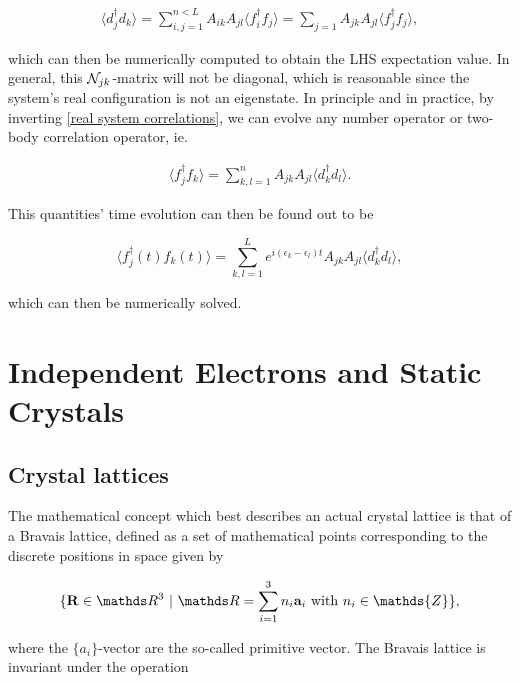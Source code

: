 \documentclass{homework}
\begin{document}
\begin{align*}
    \langle d_j^\dagger d_k \rangle = \sum_{i,j = 1}^{n < L} A_{ik} A_{jl} \langle f_i^\dagger f_j \rangle = \sum_{j=1} A_{jk} A_{jl} \langle f_j^\dagger f_j \rangle,
    \label{real system correlations}
\end{align*}

which can then be numerically computed to obtain the LHS expectation value. In general, this $\mathcal{N}_{jk}$-matrix will not be diagonal, which is reasonable since the system's real configuration is not an eigenstate. In principle and in practice, by inverting \eqref{real system correlations}, we can evolve any number operator or two-body correlation operator, ie.

\begin{align}
    \langle f_j^\dagger f_k \rangle = \sum_{k,l =1}^{n} A_{jk} A_{jl} \langle d_k^\dagger d_l \rangle.
\end{align}

This quantities' time evolution can then be found out to be 

\begin{equation}
    \langle f_j^\dagger(t) f_k(t) \rangle = \sum_{k,l =1}^{L} e^{i(\epsilon_k - \epsilon_l)t}A_{jk} A_{jl} \langle d_k^\dagger d_l \rangle,
\end{equation}

which can then be numerically solved. 

\clearpage 

\section{Independent Electrons and Static Crystals}

\subsection{Crystal lattices} 

The mathematical concept which best describes an actual crystal lattice is that of a Bravais lattice, defined as a set of mathematical points corresponding to the discrete positions in space given by 

\begin{equation}
    \{\Rb \in \R^{3} \blanky | \blanky \R = \sum_{i=1}^{3} n_i {\bf a}_i \textnormal{ with } n_i \in \mathds{Z}\},
\end{equation}
    

where the $\{a_i\}$-vector are the so-called primitive vector. The Bravais lattice is invariant under the operation 
\end{document}
